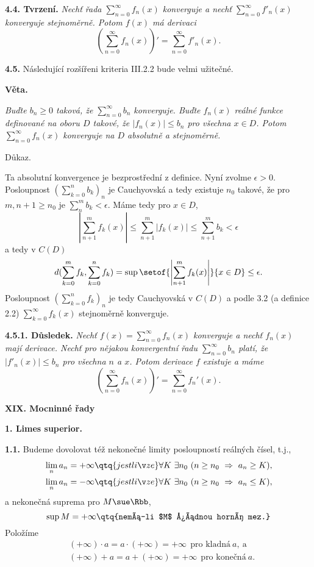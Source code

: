 \documentclass[12pt]{article}
\begin{document}
\medskip

{\bf 4.4. Tvrzení.} {\em Nechť řada $\sum_{n=0}^\infty f_n(x)$ konverguje a nechť
$\sum_{n=0}^\infty f'_n(x)$ konverguje stejnoměrně. Potom $f(x)$ má derivaci
$$
\left(\sum_{n=0}^\infty f_n(x)\right)'=\sum_{n=0}^\infty f'_n(x).
$$}

\bigskip

{\bf 4.5.} Následující rozšířeni kriteria III.2.2 bude velmi užitečné.

\medskip

{\bf Věta.} {\em Buďte  $b_n\geq 0$ taková, že $\sum_{n=0}^\infty b_n$ konverguje. Buďte $f_n(x)$ reálné funkce definované na oboru $D$ takové, že $|f_n(x)|\leq b_n$ pro všechna $x\in D$. Potom $\sum_{n=0}^\infty f_n(x)$ konverguje na $D$ absolutně a stejnoměrně.

Důkaz.} Ta absolutní konvergence je bezprostřední z definice. Nyní zvolme $\epsilon>0$. Posloupnost $(\sum_{k=0}^n b_k)_n$ je Cauchyovská a tedy existuje  $n_0$ takové, že pro $m,
 n+1\geq n_0$ je $\sum_n^m b_k<\epsilon$. Máme tedy pro $x\in D$,
$$
\left|\sum_{n+1}^m f_k(x)\right|\leq\sum_{n+1}^m |f_k(x)|\leq\sum_{n+1}^m b_k<\epsilon
$$
a tedy v $C(D)$
$$
d(\sum_{k=0}^m f_k,\sum_{k=0}^n f_k)=\sup\setof{\left|\sum_{n+1}^m f_k(x)\right|}{x\in D}\leq\epsilon.
$$
Posloupnost $(\sum_{k=0}^n f_k)_n$ je tedy Cauchyovská v $C(D)$ a podle 3.2 (a definice 2.2)
$\sum_{k=0}^\infty f_k(x)$ stejnoměrně konverguje. \sq

\medskip

{\bf 4.5.1. Důsledek.} {\em Nechť $f(x)=\sum_{n=0}^\infty f_n(x)$ konverguje a nechť 
$f_n(x)$ mají derivace. Nechť pro nějakou konvergentní řadu $\sum_{n=0}^\infty b_n$ platí, že $|f'_n(x)|\leq b_n$ pro všechna $n$ a $x$. Potom derivace $f$ existuje a máme
$$
\left(\sum_{n=0}^\infty f_n(x)\right)'=\sum_{n=0}^\infty f_n'(x).
$$}


\newpage

\centerline{\Large\bf XIX. Mocninné řady} 
 
 \vskip10mm
 
  
 {\large\bf 1. Limes superior.}
 
 \bigskip
 
 {\bf 1.1.} Budeme dovolovat též nekonečné limity posloupností reálných čísel, t.j.,
 $$\begin{aligned}
 &\lim_n a_n=+\infty \qtq{jestliže} \forall K\ \exists n_0\ (n\geq n_0\ \Rightarrow \ a_n\geq K),\\
&\lim_n a_n=-\infty \qtq{jestliže} \forall K\ \exists n_0\ (n\geq n_0\ \Rightarrow \ a_n\leq K),
\end{aligned}
 $$
a nekonečná suprema pro $M\sue\Rbb$,
 $$
 \sup M=+\infty \qtq{nemá-li $M$ žádnou horní mez.}
 $$
 Položíme
 $$
 \begin{aligned}
 &(+\infty)\cdot a= a\cdot(+\infty)=+\infty\ \ \text{pro kladná}\ a, \ \text{a}\\
 &(+\infty)+ a= a+(+\infty)=+\infty\ \ \text{pro konečná}\ a.
 \end{aligned}
 $$
 
\end{document}
